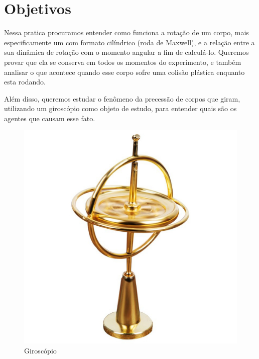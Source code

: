 \newpage
\section{Objetivos}

Nessa pratica procuramos entender como funciona a rotação de um corpo, mais especificamente um com formato cilíndrico (roda de Maxwell), e a relação entre a sua dinâmica de rotação com o momento angular a fim de calculá-lo. Queremos provar que ela se conserva em todos os momentos do experimento, e também analisar o que acontece quando esse corpo sofre uma colisão plástica enquanto esta rodando.

Além disso, queremos estudar o fenômeno da precessão de corpos que giram, utilizando um giroscópio como objeto de estudo, para entender quais são os agentes que causam esse fato.

\begin{figure}[H]
  \centering
  \includegraphics[scale=0.2]{images/giroscopio-brinquedo.jpg}
  \caption{Giroscópio}
\end{figure}

